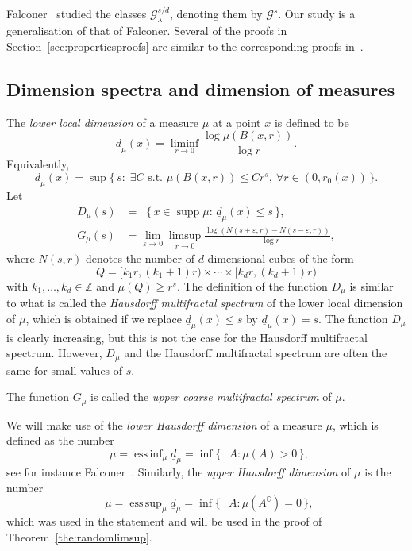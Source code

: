 \documentclass[10pt]{amsart}
\theoremstyle{definition}\newtheorem{defi}[theo]{Definition}\newtheorem{rema}[theo]{Remark}\newtheorem{exam}[theo]{Example}\newtheorem{exem}[theo]{Example}\newtheorem{nota}[theo]{Notation}
\DeclareMathOperator{\dimh}{dim_H}
\DeclareMathOperator{\ldimh}{\underline{dim}_H}
\DeclareMathOperator{\udimh}{\overline{dim}_H}
\DeclareMathOperator{\supp}{supp}
\DeclareMathOperator*{\essinf}{ess\,inf}
\DeclareMathOperator*{\esssup}{ess\,sup}
\let\oldexists\exists
\renewcommand*{\exists}{\mathrel{\oldexists}}
\let\oldforall\forall
\renewcommand*{\forall}{\mathrel{\oldforall}}
\begin{document}
Falconer~\cite{falconer1, falconer2} studied the classes $\mathscr{G}_\lambda^{s/d}$, denoting them by $\mathscr{G}^s$. Our study is a generalisation of that of Falconer. Several of the proofs in Section~\ref{sec:propertiesproofs} are similar to the corresponding proofs in~\cite{falconer2}.


\subsection{Dimension spectra and dimension of measures} \label{ssec:dimensiondefinitions}

The {\em lower local dimension} of a measure $\mu$ at a point $x$ is defined to be
\[
\underline{d}_\mu (x) = \liminf_{r \to 0} \frac{\log \mu (B(x,r))}{\log r}.
\]
Equivalently,
\[
\underline{d}_\mu (x) = \sup \{\, s :\; \exists C \text{ s.t. } \mu (B(x,r)) \leq C r^s, \ \forall r \in (0, r_0 (x)) \,\}.
\]
Let
\begin{align*}
D_\mu (s) &= \dimh \{\, x \in \supp \mu : \, \underline{d}_\mu (x)
\leq s \,\},\\
G_\mu (s) &= \lim_{\varepsilon \to 0} \limsup_{r \to 0} \frac{\log (N (s + \varepsilon, r) - N (s - \varepsilon, r))}{- \log r},
\end{align*}
where $N (s, r)$ denotes the number of $d$-dimensional cubes of the form
\[
Q = [k_1 r, (k_1+1) r) \times \cdots \times [k_d r, (k_d+1) r)
\]
with $k_1, \ldots, k_d \in \mathbb{Z}$ and $\mu (Q) \geq r^s$. The definition of the function $D_\mu$ is similar to what is called the
\emph{Hausdorff multifractal spectrum} of the lower local dimension of $\mu$, which is obtained if we replace $\underline{d}_\mu (x) \leq s$ by $\underline{d}_\mu (x) = s$. The function $D_\mu$ is clearly increasing, but this is not the case for the Hausdorff multifractal spectrum. However, $D_\mu$ and the Hausdorff multifractal spectrum are often the same for small values of $s$.

The function $G_\mu$ is called the \emph{upper coarse multifractal spectrum} of $\mu$.

We will make use of the {\em lower Hausdorff dimension} of a measure $\mu$, which is defined as the number
\[
\ldimh \mu = \essinf_{\mu} \underline{d}_\mu = \inf \{\, \dimh A :
\mu (A) > 0 \,\},
\]
see for instance Falconer~\cite[Proposition~10.2]{falconertechniques}. Similarly, the {\em upper Hausdorff dimension} of $\mu$ is the number
\[
\udimh \mu = \esssup_{\mu} \underline{d}_\mu = \inf \{\, \dimh A :
\mu (A^\complement) = 0 \,\},
\]
which was used in the statement and will be used in the proof of Theorem~\ref{the:randomlimsup}.
\end{document}
